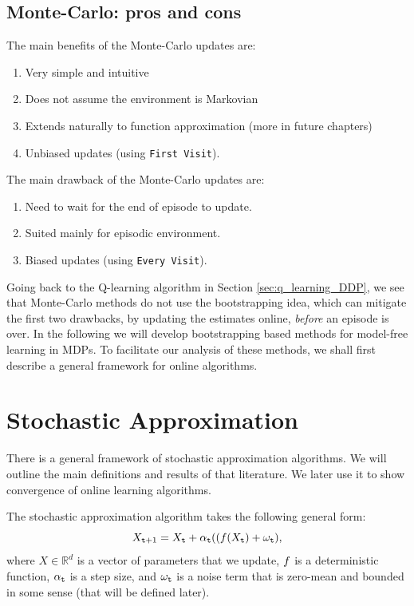 \subsection{Monte-Carlo: pros and cons}

The main benefits of the Monte-Carlo updates are:
\begin{enumerate}
\item Very simple and intuitive
\item Does not assume the environment is Markovian
\item Extends naturally to function approximation (more in future
chapters)
\item Unbiased updates (using {\tt First Visit}).
\end{enumerate}

\noindent
The main drawback of the Monte-Carlo updates are:
\begin{enumerate}
\item Need to wait for the end of episode to update.
\item Suited mainly for episodic environment.
\item Biased updates (using {\tt Every Visit}).
\end{enumerate}

Going back to the Q-learning algorithm in Section \ref{sec:q_learning_DDP}, we see that Monte-Carlo methods do not use the bootstrapping idea, which can mitigate the first two drawbacks, by updating the estimates online, \textit{before} an episode is over. In the following we will develop bootstrapping based methods for model-free learning in MDPs. To facilitate our analysis of these methods, we shall first describe a general framework for online algorithms.

\section{Stochastic Approximation}
\label{sec:stochastic-approximation}

There is a general framework of stochastic approximation algorithms.
We will outline the main definitions and results of that literature.
We later use it to show convergence of online learning algorithms.

The stochastic approximation algorithm takes the following general form:
\begin{equation}\label{eq:stochastic_approx}
X_{{\tt t}+1} =
X_{\tt t}+\alpha_{\tt t}((f(X_{\tt t})+\omega_{\tt t}),
\end{equation}
where $X\in \mathbb{R}^d$ is a vector of parameters that we update, $f$ is a deterministic function, $\alpha_{\tt t}$ is a step size, and $\omega_{\tt t}$ is a noise term that is zero-mean and bounded in some sense (that will be defined later).

